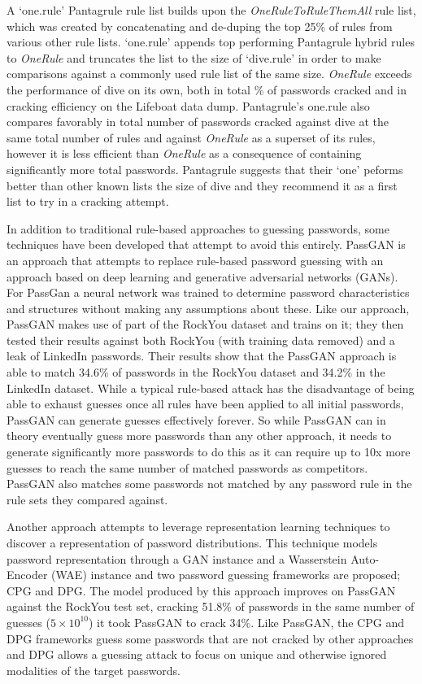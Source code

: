 \documentclass[letterpaper,twocolumn,10pt]{article}
\begin{document}
A `one.rule' Pantagrule rule list builds upon the \textit{OneRuleToRuleThemAll}
rule list, which was created by concatenating and de-duping the top 25\% of
rules from various other rule lists.\cite{ortrta} `one.rule' appends top
performing Pantagrule hybrid rules to \textit{OneRule} and truncates the list
to the size of `dive.rule' in order to make comparisons against a commonly used
rule list of the same size.
\textit{OneRule} exceeds the performance of dive on its own, both in total \%
of passwords cracked and in cracking efficiency on the Lifeboat data dump.
Pantagrule's one.rule also compares favorably in total number of passwords
cracked against dive at the same total number of rules and against
\textit{OneRule} as a superset of its rules, however it is less efficient than
\textit{OneRule} as a consequence of containing significantly more total
passwords. Pantagrule suggests that their `one' peforms better than other known
lists the size of dive and they recommend it as a first list to try in a
cracking attempt.


In addition to traditional rule-based approaches to guessing passwords, some
techniques have been developed that attempt to avoid this entirely.
PassGAN\cite{hitaj2019passgan} is an approach that attempts to replace
rule-based password guessing with an approach based on deep learning and
generative adversarial networks (GANs). For PassGan a neural network was
trained to determine password characteristics and structures without making any
assumptions about these. Like our approach, PassGAN makes use of part of the
RockYou dataset and trains on it; they then tested their results against both
RockYou (with training data removed) and a leak of LinkedIn passwords. Their
results show that the PassGAN approach is able to match 34.6\% of passwords in
the RockYou dataset and 34.2\% in the LinkedIn dataset. While a typical
rule-based attack has the disadvantage of being able to exhaust guesses once
all rules have been applied to all initial passwords, PassGAN can generate
guesses effectively forever. So while PassGAN can in theory eventually guess
more passwords than any other approach, it needs to generate significantly more
passwords to do this as it can require up to 10x more guesses to reach the same
number of matched passwords as competitors. PassGAN also matches some passwords
not matched by any password rule in the rule sets they compared against.

Another approach\cite{pasquini2021improving} attempts to leverage
representation learning techniques to discover a representation of password
distributions. This technique models password representation through a GAN
instance and a Wasserstein Auto-Encoder (WAE) instance and two password guessing
frameworks are proposed; CPG and DPG. The model produced by this approach
improves on PassGAN against the RockYou test set, cracking 51.8\% of passwords
in the same number of guesses ($5 \times 10^{10}$) it took PassGAN to crack 34\%.
Like PassGAN, the CPG and DPG frameworks guess some passwords that are not
cracked by other approaches and DPG allows a guessing attack to focus on unique
and otherwise ignored modalities of the target passwords.
\end{document}
